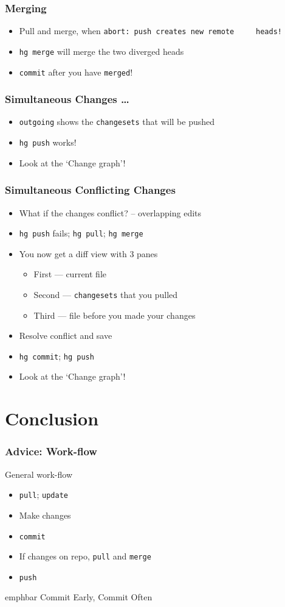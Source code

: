 \documentclass[14pt,compress]{beamer}
\newcommand{\emphbar}[1]
{\begin{beamercolorbox}[rounded=true]{emphbar} 
      {#1}
 \end{beamercolorbox}
}
\newcommand{\typ}[1]{\lstinline{#1}}
\begin{document}
\begin{frame}
  \frametitle{Merging}
  \begin{itemize}
  \item Pull and merge, when \typ{abort: push creates new remote
    heads!}
  \item \typ{hg merge} will merge the two diverged heads
  \item \typ{commit} after you have \typ{merged}!
  \end{itemize}
\end{frame}

\begin{frame}
  \frametitle{Simultaneous Changes \ldots}
  \begin{itemize}
  \item \typ{outgoing} shows the \typ{changesets} that will be pushed
  \item \typ{hg push} works!
  \item Look at the `Change graph'!
  \end{itemize}
\end{frame}

\begin{frame}
  \frametitle{Simultaneous Conflicting Changes}
  \begin{itemize}
  \item What if the changes conflict? -- overlapping edits
  \item \typ{hg push} fails; \typ{hg pull}; \typ{hg merge}
  \item You now get a diff view with 3 panes 
    \begin{itemize}
    \item First --- current file
    \item Second --- \typ{changesets} that you pulled
    \item Third --- file before you made your changes
    \end{itemize}
  \item Resolve conflict and save
  \item \typ{hg commit}; \typ{hg push}
  \item Look at the `Change graph'!
  \end{itemize}
\end{frame}

\section{Conclusion}

\begin{frame}
  \frametitle{\alert{Advice}: Work-flow}
  General work-flow
  \begin{itemize}
  \item \typ{pull}; \typ{update}
  \item Make changes
  \item \typ{commit}
  \item If changes on repo, \typ{pull} and \typ{merge}
  \item \typ{push}
  \end{itemize}
  \emphbar{Commit Early, Commit Often}
\end{frame}
\end{document}

